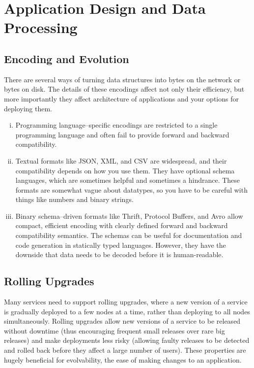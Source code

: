 \documentclass{article}
\begin{document}
\newpage
\section{Application Design and Data Processing}
    \subsection{Encoding and Evolution}
    There are several ways of turning data structures into bytes on the network or bytes on disk. The details of these encodings affect not only their efficiency, but more importantly they affect architecture of applications and your options for deploying them.
    
    \begin{enumerate}[i.]
        \item Programming language–specific encodings are restricted to a single programming language and often fail to provide forward and backward compatibility.
        \item Textual formats like JSON, XML, and CSV are widespread, and their compatibility depends on how you use them. They have optional schema languages, which are sometimes helpful and sometimes a hindrance. These formats are somewhat vague about datatypes, so you have to be careful with things like numbers and  binary strings.
        \item Binary schema–driven formats like Thrift, Protocol Buffers, and Avro allow compact, efficient encoding with clearly defined forward and backward compatibility semantics. The schemas can be useful for documentation and code generation in statically typed languages. However, they have the downside that data   needs to be decoded before it is human-readable.
    \end{enumerate}
    
    \subsection{Rolling Upgrades}
    Many services need to support rolling upgrades, where a new version of a service is gradually deployed to a few nodes at a time, rather than deploying to all nodes simultaneously. Rolling upgrades allow new versions of a service to be released without downtime (thus encouraging frequent small releases over rare big releases) and make deployments less risky (allowing faulty releases to be detected and rolled back before they affect a large number of users). These properties are hugely beneficial for evolvability, the ease of making changes to an application.
    
\end{document}
